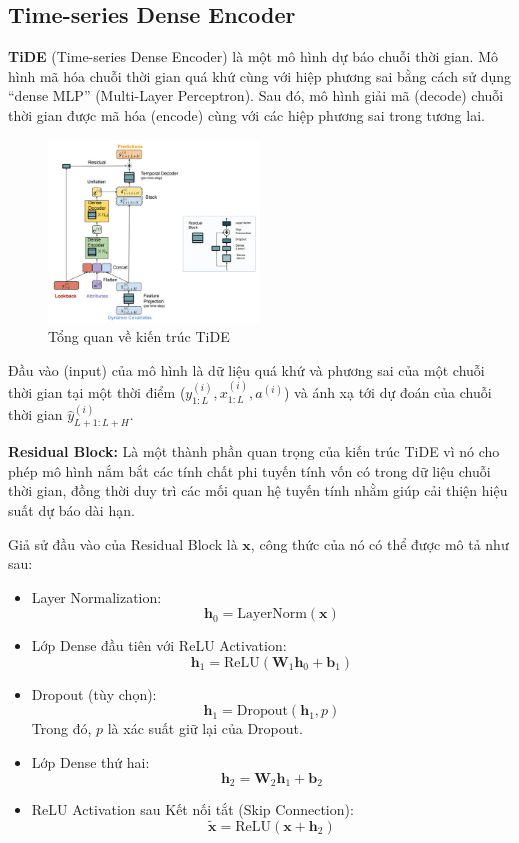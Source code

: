 \subsection{Time-series Dense Encoder}
\textbf{TiDE} (Time-series Dense Encoder) là một mô hình dự báo chuỗi thời gian. Mô hình mã hóa chuỗi thời gian quá khứ cùng với hiệp phương sai bằng cách sử dụng “dense MLP” (Multi-Layer Perceptron). Sau đó, mô hình giải mã (decode) chuỗi thời gian được mã hóa (encode) cùng với các hiệp phương sai trong tương lai.
\begin{figure}[h]
    \centering
    \includegraphics[width=0.5\textwidth]{img/TiDE.png}
    \caption{Tổng quan về kiến trúc TiDE}
    \label{fig:your_figure_label}
\end{figure}

 Đầu vào (input) của mô hình là dữ liệu quá khứ và phương sai của một chuỗi thời gian tại một thời điểm ($y_{1:L}^{(i)}, x_{1:L}^{(i)}, a^{(i)}$) và ánh xạ tới dự đoán của chuỗi thời gian $\hat{y}_{L+1:L+H}^{(i)}$.

\textbf{Residual Block:} Là một thành phần quan trọng của kiến trúc TiDE vì nó cho phép mô hình nắm bắt các tính chất phi tuyến tính vốn có trong dữ liệu chuỗi thời gian, đồng thời duy trì các mối quan hệ tuyến tính nhằm giúp cải thiện hiệu suất dự báo dài hạn. 

Giả sử đầu vào của Residual Block là \( \mathbf{x} \), công thức của nó có thể được mô tả như sau:

\begin{itemize}
    \item Layer Normalization:
    \[
    \mathbf{h}_0 = \text{LayerNorm}(\mathbf{x})
    \]

    \item Lớp Dense đầu tiên với ReLU Activation:
    \[
    \mathbf{h}_1 = \text{ReLU}(\mathbf{W}_1 \mathbf{h}_0 + \mathbf{b}_1)
    \]

    \item Dropout (tùy chọn):
    \[
    \mathbf{h}_1 = \text{Dropout}(\mathbf{h}_1, p)
    \]
    Trong đó, \( p \) là xác suất giữ lại của Dropout.

    \item Lớp Dense thứ hai:
    \[
    \mathbf{h}_2 = \mathbf{W}_2 \mathbf{h}_1 + \mathbf{b}_2
    \]

    \item  ReLU Activation sau Kết nối tắt (Skip Connection):
    \[
    \tilde{\mathbf{x}} = \text{ReLU}(\mathbf{x} + \mathbf{h}_2)
    \]

\end{itemize}

